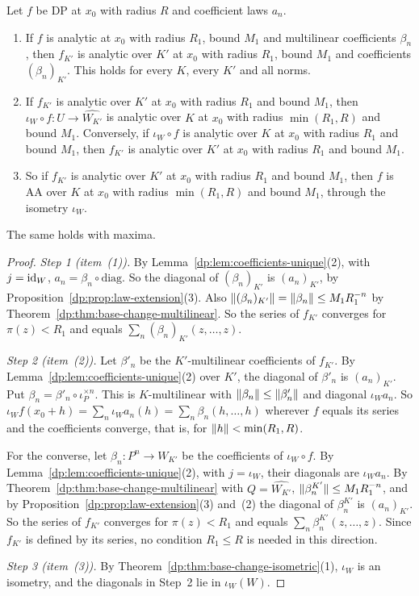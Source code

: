 \begin{theorem}\label{dp:thm:an-base-change}
Let $f$ be DP at $x_0$ with radius $R$ and coefficient laws $a_n$.
\begin{enumerate}
\item If $f$ is analytic at $x_0$ with radius $R_1$, bound $M_1$ and multilinear coefficients $\beta_n$, then $f_{K'}$ is analytic over $K'$ at $x_0$ with radius $R_1$, bound $M_1$ and coefficients $(\beta_n)_{K'}$. This holds for every $K$, every $K'$ and all norms.
\item If $f_{K'}$ is analytic over $K'$ at $x_0$ with radius $R_1$ and bound $M_1$, then $\iota_W\circ f\colon U\to\widehat{W_{K'}}$ is analytic over $K$ at $x_0$ with radius $\min(R_1,R)$ and bound $M_1$. Conversely, if $\iota_W\circ f$ is analytic over $K$ at $x_0$ with radius $R_1$ and bound $M_1$, then $f_{K'}$ is analytic over $K'$ at $x_0$ with radius $R_1$ and bound $M_1$.
\item So if $f_{K'}$ is analytic over $K'$ at $x_0$ with radius $R_1$ and bound $M_1$, then $f$ is AA over $K$ at $x_0$ with radius $\min(R_1,R)$ and bound $M_1$, through the isometry $\iota_W$.
\end{enumerate}
The same holds with maxima.
\end{theorem}

\begin{proof}
\emph{Step 1 (item~(1)).} By Lemma~\ref{dp:lem:coefficients-unique}(2), with $j=\mathrm{id}_W$, $a_n=\beta_n\circ\mathrm{diag}$. So the diagonal of $(\beta_n)_{K'}$ is $(a_n)_{K'}$, by Proposition~\ref{dp:prop:law-extension}(3). Also $\lVert (\beta_n)_{K'}\rVert=\lVert \beta_n\rVert\le M_1R_1^{-n}$ by Theorem~\ref{dp:thm:base-change-multilinear}. So the series of $f_{K'}$ converges for $\pi(z)<R_1$ and equals $\sum_n(\beta_n)_{K'}(z,\dots,z)$.

\emph{Step 2 (item~(2)).} Let $\beta'_n$ be the $K'$-multilinear coefficients of $f_{K'}$. By Lemma~\ref{dp:lem:coefficients-unique}(2) over $K'$, the diagonal of $\beta'_n$ is $(a_n)_{K'}$. Put $\beta_n=\beta'_n\circ\iota_P^{\times n}$. This is $K$-multilinear with $\lVert \beta_n\rVert\le\lVert \beta'_n\rVert$ and diagonal $\iota_Wa_n$. So $\iota_Wf(x_0+h)=\sum_n\iota_Wa_n(h)=\sum_n\beta_n(h,\dots,h)$ wherever $f$ equals its series and the coefficients converge, that is, for $\lVert h\rVert<\min(R_1,R)$.

For the converse, let $\beta_n\colon P^n\to\widehat{W_{K'}}$ be the coefficients of $\iota_W\circ f$. By Lemma~\ref{dp:lem:coefficients-unique}(2), with $j=\iota_W$, their diagonals are $\iota_Wa_n$. By Theorem~\ref{dp:thm:base-change-multilinear} with $Q=\widehat{W_{K'}}$, $\lVert \beta_n^{K'}\rVert\le M_1R_1^{-n}$, and by Proposition~\ref{dp:prop:law-extension}(3) and~(2) the diagonal of $\beta_n^{K'}$ is $(a_n)_{K'}$. So the series of $f_{K'}$ converges for $\pi(z)<R_1$ and equals $\sum_n\beta_n^{K'}(z,\dots,z)$. Since $f_{K'}$ is defined by its series, no condition $R_1\le R$ is needed in this direction.

\emph{Step 3 (item~(3)).} By Theorem~\ref{dp:thm:base-change-isometric}(1), $\iota_W$ is an isometry, and the diagonals in Step~2 lie in $\iota_W(W)$.
\end{proof}


